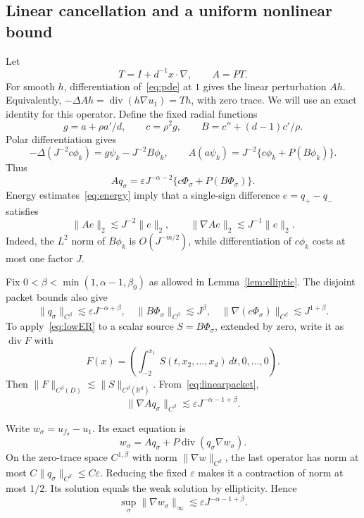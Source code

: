 \documentclass[11pt]{article}
\theoremstyle{remark}
\newcommand{\R}{\mathbb R}
\newcommand{\diver}{\operatorname{div}}
\newcommand{\norm}[1]{\lVert #1\rVert}
\begin{document}
\subsection{Linear cancellation and a uniform nonlinear bound}
Let
\[
 T=I+d^{-1}x\cdot\nabla,\qquad A=PT.
\]
For smooth $h$, differentiation of~\eqref{eq:pde} at $1$ gives the linear perturbation $Ah$. 
Equivalently, $-\Delta Ah=\diver(h\nabla u_1)=Th$, with zero trace. We will use an exact identity for this operator. Define the fixed radial functions
\[
 g=a+\rho a'/d,\qquad c=\rho^2g,\qquad
 B=c''+(d-1)c'/\rho.
\]
Polar differentiation gives
\[
 -\Delta(J^{-2}c\phi_k)=g\psi_k-J^{-2}B\phi_k,
 \qquad
 A(a\psi_k)=J^{-2}\{c\phi_k+P(B\phi_k)\}.
\]
Thus
\begin{equation}\label{eq:linearpacket}
 Aq_\sigma=\varepsilon J^{-\alpha-2}
 \{c\Phi_\sigma+P(B\Phi_\sigma)\}.
\end{equation}
Energy estimates~\eqref{eq:energy} imply that a single-sign difference $e=q_+-q_-$ satisfies 
\begin{equation}\label{eq:singlelinear}
 \norm{Ae}_2\lesssim J^{-2}\norm e_2,
 \qquad \norm{\nabla Ae}_2\lesssim J^{-1}\norm e_2.
\end{equation}
Indeed, the $L^2$ norm of $B\phi_k$ is $O(J^{-m/2})$, while differentiation of $c\phi_k$ costs at most one factor $J$.

Fix $0<\beta<\min(1,\alpha-1,\beta_0)$ as allowed in Lemma~\ref{lem:elliptic}. The disjoint packet bounds also give
\[
 \norm{q_\sigma}_{C^\beta}\lesssim\varepsilon J^{-\alpha+\beta},\quad
 \norm{B\Phi_\sigma}_{C^\beta}\lesssim J^\beta,\quad
 \norm{\nabla(c\Phi_\sigma)}_{C^\beta}\lesssim J^{1+\beta}.
\]
To apply~\eqref{eq:lowER} to a scalar source $S=B\Phi_\sigma$, extended by zero, write it as $\diver F$ with
\[
 F(x)=\left(\int_{-2}^{x_1}S(t,x_2,\ldots,x_d)\,dt,0,\ldots,0\right).
\]
Then $\norm F_{C^\beta(D)}\lesssim\norm S_{C^\beta(\R^d)}$. From~\eqref{eq:linearpacket},
\begin{equation}\label{eq:linholder}
 \norm{\nabla Aq_\sigma}_{C^\beta}\lesssim
 \varepsilon J^{-\alpha-1+\beta}.
\end{equation}

Write $w_\sigma=u_{f_\sigma}-u_1$. Its exact equation is
\begin{equation}\label{eq:nonlinpacket}
 w_\sigma=Aq_\sigma+P\diver(q_\sigma\nabla w_\sigma).
\end{equation}
On the zero-trace space $C^{1,\beta}$ with norm $\norm{\nabla w}_{C^\beta}$, the last operator has norm at most $C\norm{q_\sigma}_{C^\beta}\le C\varepsilon$. Reducing the fixed $\varepsilon$ makes it a contraction of norm at most $1/2$. Its solution equals the weak solution by ellipticity. Hence
\begin{equation}\label{eq:nonlinuniform}
 \sup_\sigma\norm{\nabla w_\sigma}_\infty
 \lesssim\varepsilon J^{-\alpha-1+\beta}.
\end{equation}
\end{document}
